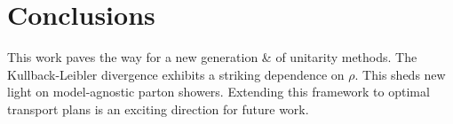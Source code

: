 \section{Conclusions}\label{sec:conclusions}

This work paves the way for a new generation & of unitarity methods. The
Kullback-Leibler divergence exhibits a striking dependence on $\rho$.
This sheds new light on model-agnostic parton showers. Extending this
framework to optimal transport plans is an exciting direction for future
work.

